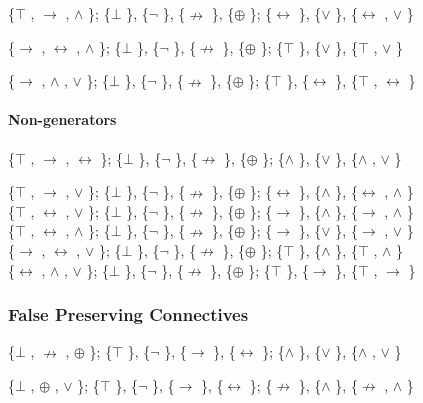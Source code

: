 \{$\top$ , $\to$ , $\land$ \}; \{$\bot$ \}, \{$\neg$ \}, \{$\nrightarrow$ \}, \{$\oplus$ \}; \{$\leftrightarrow$ \}, \{$\lor$ \}, \{$\leftrightarrow$ , $\lor$ \}

\{$\to$ , $\leftrightarrow$ , $\land$ \}; \{$\bot$ \}, \{$\neg$ \}, \{$\nrightarrow$ \}, \{$\oplus$ \}; \{$\top$ \}, \{$\lor$ \}, \{$\top$ , $\lor$ \}

\{$\to$ , $\land$ , $\lor$ \}; \{$\bot$ \}, \{$\neg$ \}, \{$\nrightarrow$ \}, \{$\oplus$ \}; \{$\top$ \}, \{$\leftrightarrow$ \}, \{$\top$ , $\leftrightarrow$ \}

\hypertarget{non-generators-2}{%
\paragraph{Non-generators}\label{non-generators-2}}

\{$\top$ , $\to$ , $\leftrightarrow$ \}; \{$\bot$ \}, \{$\neg$ \}, \{$\nrightarrow$ \}, \{$\oplus$ \}; \{$\land$ \}, \{$\lor$ \}, \{$\land$ , $\lor$ \}

\{$\top$ , $\to$ , $\lor$ \}; \{$\bot$ \}, \{$\neg$ \}, \{$\nrightarrow$ \}, \{$\oplus$ \}; \{$\leftrightarrow$ \}, \{$\land$ \}, \{$\leftrightarrow$ , $\land$ \}\\
\{$\top$ , $\leftrightarrow$ , $\lor$ \}; \{$\bot$ \}, \{$\neg$ \}, \{$\nrightarrow$ \}, \{$\oplus$ \}; \{$\to$ \}, \{$\land$ \}, \{$\to$ , $\land$ \}\\
\{$\top$ , $\leftrightarrow$ , $\land$ \}; \{$\bot$ \}, \{$\neg$ \}, \{$\nrightarrow$ \}, \{$\oplus$ \}; \{$\to$ \}, \{$\lor$ \}, \{$\to$ , $\lor$ \}\\
\{$\to$ , $\leftrightarrow$ , $\lor$ \}; \{$\bot$ \}, \{$\neg$ \}, \{$\nrightarrow$ \}, \{$\oplus$ \}; \{$\top$ \}, \{$\land$ \}, \{$\top$ , $\land$ \}\\
\{$\leftrightarrow$ , $\land$ , $\lor$ \}; \{$\bot$ \}, \{$\neg$ \}, \{$\nrightarrow$ \}, \{$\oplus$ \}; \{$\top$ \}, \{$\to$ \}, \{$\top$ , $\to$ \}

\hypertarget{false-preserving-connectives}{%
\subsubsection{False Preserving
Connectives}\label{false-preserving-connectives}}

\{$\bot$ , $\nrightarrow$ , $\oplus$ \}; \{$\top$ \}, \{$\neg$ \}, \{$\to$ \}, \{$\leftrightarrow$ \}; \{$\land$ \}, \{$\lor$ \}, \{$\land$ , $\lor$ \}

\{$\bot$ , $\oplus$ , $\lor$ \}; \{$\top$ \}, \{$\neg$ \}, \{$\to$ \}, \{$\leftrightarrow$ \}; \{$\nrightarrow$ \}, \{$\land$ \}, \{$\nrightarrow$ , $\land$ \}

